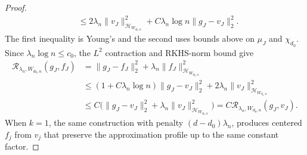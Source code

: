 \documentclass[letterpaper,12pt]{article}
\theoremstyle{definition}
\numberwithin{equation}{section}
\newcommand{\mc}{\mathcal}
\newcommand{\norm}[1]{\lVert#1\rVert}
\begin{document}
\begin{proof}
\begin{align*}
&\leq2\lambda_n\norm{v_J}_{\mc H_{W_{d_0,n}}}^2+C\lambda_n\log n\norm{g_J-v_J}_2^2.
\end{align*}
The first inequality is Young's and the second uses bounds above on $\mu_J$ and $\chi_{d_0}$.
Since $\lambda_n\log n\leq c_0$, the $L^2$ contraction and RKHS-norm bound give
\begin{align*}
\mathcal R_{\lambda_n,W_{d_0,n}}(g_J,f_J)&=\norm{g_J-f_J}_2^2+\lambda_n\norm{f_J}_{\mc H_{W_{d_0,n}}}^2\\
&\leq(1+C\lambda_n\log n)\norm{g_J-v_J}_2^2+2\lambda_n\norm{v_J}_{\mc H_{W_{d_0,n}}}^2\\
&\leq C\big(\norm{g_J-v_J}_2^2+\lambda_n\norm{v_J}_{\mc H_{W_{d_0,n}}}^2 \big)=C\mathcal R_{\lambda_n,W_{d_0,n}}(g_J,v_J).
\end{align*}
When $k=1$, the same construction with penalty $(d-d_0)\lambda_n$, produces centered $f_j$ from $v_j$ that preserve the approximation profile up to the same constant factor.


\end{proof}
\end{document}
